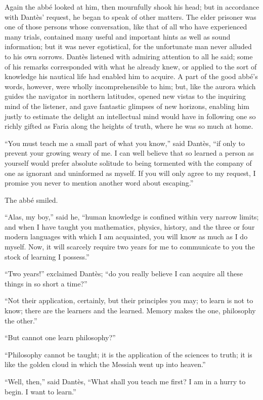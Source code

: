 Again the abbé looked at him, then mournfully shook his head; but in
accordance with Dantès’ request, he began to speak of other matters.
The elder prisoner was one of those persons whose conversation, like
that of all who have experienced many trials, contained many useful and
important hints as well as sound information; but it was never
egotistical, for the unfortunate man never alluded to his own sorrows.
Dantès listened with admiring attention to all he said; some of his
remarks corresponded with what he already knew, or applied to the sort
of knowledge his nautical life had enabled him to acquire. A part of
the good abbé’s words, however, were wholly incomprehensible to him;
but, like the aurora which guides the navigator in northern latitudes,
opened new vistas to the inquiring mind of the listener, and gave
fantastic glimpses of new horizons, enabling him justly to estimate the
delight an intellectual mind would have in following one so richly
gifted as Faria along the heights of truth, where he was so much at
home.

“You must teach me a small part of what you know,” said Dantès, “if
only to prevent your growing weary of me. I can well believe that so
learned a person as yourself would prefer absolute solitude to being
tormented with the company of one as ignorant and uninformed as myself.
If you will only agree to my request, I promise you never to mention
another word about escaping.”

The abbé smiled.

“Alas, my boy,” said he, “human knowledge is confined within very
narrow limits; and when I have taught you mathematics, physics,
history, and the three or four modern languages with which I am
acquainted, you will know as much as I do myself. Now, it will scarcely
require two years for me to communicate to you the stock of learning I
possess.”

“Two years!” exclaimed Dantès; “do you really believe I can acquire all
these things in so short a time?”

“Not their application, certainly, but their principles you may; to
learn is not to know; there are the learners and the learned. Memory
makes the one, philosophy the other.”

“But cannot one learn philosophy?”

“Philosophy cannot be taught; it is the application of the sciences to
truth; it is like the golden cloud in which the Messiah went up into
heaven.”

“Well, then,” said Dantès, “What shall you teach me first? I am in a
hurry to begin. I want to learn.”


